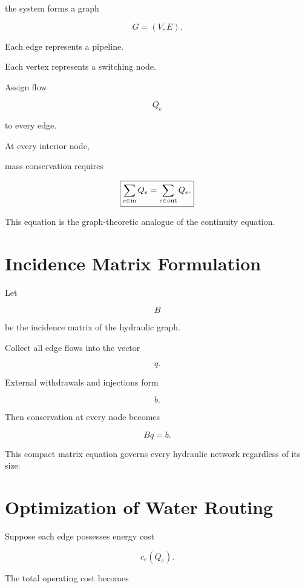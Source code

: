\documentclass[11pt,fleqn]{book}
\numberwithin{equation}{chapter}
\theoremstyle{plain}
\theoremstyle{definition}
\theoremstyle{remark}
\begin{document}
the system forms a graph

\[
G=(V,E).
\]

Each edge represents a pipeline.

Each vertex represents a switching node.


Assign flow

\[
Q_e
\]

to every edge.

At every interior node,

mass conservation requires

\[
\boxed{
\sum_{e\in{\rm in}}
Q_e
=
\sum_{e\in{\rm out}}
Q_e.
}
\]


This equation is the graph-theoretic analogue of the continuity
equation.


\section{Incidence Matrix Formulation}

Let

\[
B
\]

be the incidence matrix of the hydraulic graph.

Collect all edge flows into the vector

\[
q.
\]

External withdrawals and injections form

\[
b.
\]

Then conservation at every node becomes

\[
\boxed{
Bq=b.
}
\]

This compact matrix equation governs every hydraulic network regardless
of its size.


\section{Optimization of Water Routing}

Suppose each edge possesses energy cost

\[
c_e(Q_e).
\]

The total operating cost becomes
\end{document}
